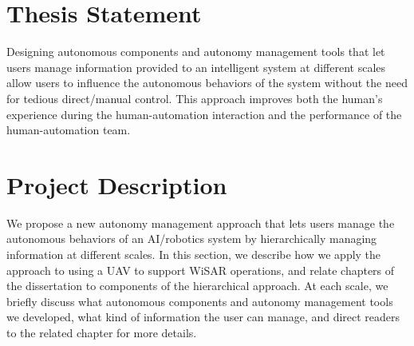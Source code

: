 \section{Thesis Statement}
\label{thesis}

Designing autonomous components and autonomy management tools that let users manage information provided to an intelligent system at different scales allow users to influence the autonomous behaviors of the system without the need for tedious direct/manual control. This approach improves both the human's experience during the human-automation interaction and the performance of the human-automation team.

\section{Project Description}
\label{project}


We propose a new autonomy management approach that lets users manage the autonomous behaviors of an AI/robotics system by hierarchically managing information at different scales. In this section, we describe how we apply the approach to using a UAV to support WiSAR operations, and relate chapters of the dissertation to components of the hierarchical approach. At each scale, we briefly discuss what autonomous components and autonomy management tools we developed, what kind of information the user can manage, and direct readers to the related chapter for more details.
 
